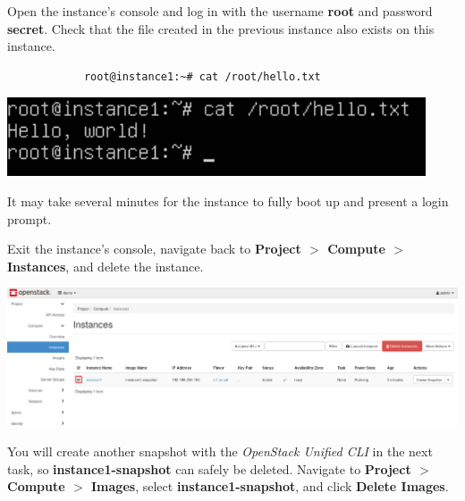 \documentclass[letterpaper, 12pt]{article}
\begin{document}
\begin{enumerate}
    \begin{labstep}
        Open the instance's console and log in with the username \textbf{root} and password \textbf{secret}.
        Check that the file created in the previous instance also exists on this instance.
        \begin{lstlisting}
            root@instance1:~# cat /root/hello.txt
        \end{lstlisting}

        \begin{center}
            \includegraphics[width=\linewidth]{images/part1/step18.png}
        \end{center}
    \end{labstep}

    \begin{notebox}
        It may take several minutes for the instance to fully boot up and present a login prompt.
    \end{notebox}

    \begin{labstep}
        Exit the instance's console, navigate back to \textbf{Project $>$ Compute $>$ Instances}, and delete the instance.

        \begin{center}
            \includegraphics[width=\linewidth]{images/part1/step19.png}
        \end{center}
    \end{labstep}

    \begin{labstep}
        You will create another snapshot with the \textit{OpenStack Unified CLI} in the next task, so \textbf{instance1-snapshot} can safely be deleted.
        Navigate to \textbf{Project $>$ Compute $>$ Images}, select \textbf{instance1-snapshot}, and click \textbf{Delete Images}.


\end{labstep}
\end{enumerate}
\end{document}
